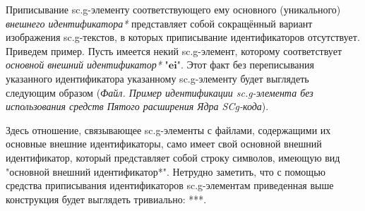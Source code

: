 \begin{SCn}
{Приписывание sc.g-элементу соответствующего ему основного (уникального) \textit{внешнего идентификатора*} представляет собой сокращённый вариант изображения sc.g-текстов, в которых приписывание идентификаторов отсутствует. Приведем пример. Пусть имеется некий sc.g-элемент, которому соответствует \textit{основной внешний идентификатор*} "$\bm{ei}$". Этот факт без переписывания указанного идентификатора указанному sc.g-элементу будет выглядеть следующим образом (\textit{Файл. Пример идентификации sc.g-элемента без использования средств Пятого расширения Ядра SCg-кода}). 

Здесь отношение, связывающее sc.g-элементы с файлами, содержащими их основные внешние идентификаторы, само имеет свой основной внешний идентификатор, который представляет собой строку символов, имеющую вид "основной внешний идентификатор*". Нетрудно заметить, что с помощью средства приписывания идентификаторов sc.g-элементам приведенная выше конструкция будет выглядеть тривиально: ***.}


\scnendstruct


\scnstartsubstruct

\bigskip
{}
\end{SCn}
